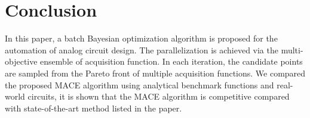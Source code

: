 \section{Conclusion}

In this paper, a batch Bayesian optimization algorithm is proposed for the
automation of analog circuit design. The parallelization is achieved via
the multi-objective ensemble of acquisition function. In each iteration, the
candidate points are sampled from the Pareto front of multiple acquisition
functions. We compared the proposed MACE algorithm using analytical benchmark
functions and real-world circuits, it is shown that the MACE algorithm is
competitive compared with state-of-the-art method listed in the paper.
